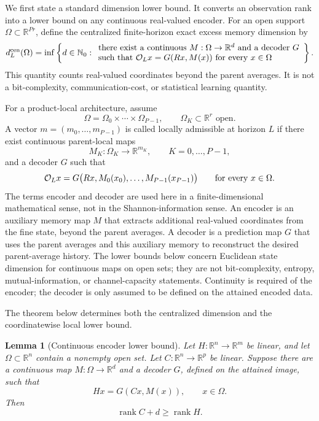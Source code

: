 \documentclass[preprint,12pt]{elsarticle}
\theoremstyle{plain}
\newtheorem{lemma}{Lemma}
\theoremstyle{remark}
\theoremstyle{definition}
\DeclareMathOperator{\rank}{rank}
\begin{document}
We first state a standard dimension lower bound.  It converts an observation
rank into a lower bound on any continuous real-valued encoder. For an open support \(\Omega\subset\mathbb R^{Pr}\), define the centralized
finite-horizon exact excess memory dimension by
\[
  d^{\rm cen}_L(\Omega)
  =
  \inf
  \left\{
   d\in\mathbb N_0:
  \begin{array}{l}
  \text{there exist a continuous }M:\Omega\to\mathbb R^d
  \text{ and a decoder }G\\
  \text{such that }
  {\cal O}_Lx=G(Rx,M(x))\text{ for every }x\in\Omega
  \end{array}
  \right\}.
\]
This quantity counts real-valued coordinates beyond the parent averages.  It
is not a bit-complexity, communication-cost, or statistical learning
quantity.

For a product-local architecture, assume
\[
  \Omega=\Omega_0\times\cdots\times\Omega_{P-1},
  \qquad
  \Omega_K\subset\mathbb R^r\text{ open}.
\]
A vector \(m=(m_0,\ldots,m_{P-1})\) is called locally admissible at horizon
\(L\) if there exist continuous parent-local maps
\[
  M_K:\Omega_K\to\mathbb R^{m_K},
  \qquad K=0,\ldots,P-1,
\]
and a decoder \(G\) such that
\[
  {\cal O}_Lx
  =
  G\bigl(Rx,M_0(x_0),\ldots,M_{P-1}(x_{P-1})\bigr)
  \qquad
  \text{for every }x\in\Omega.
\]
The terms encoder and decoder are used here in a finite-dimensional
mathematical sense, not in the Shannon-information sense.  An encoder is an
auxiliary memory map \(M\) that extracts additional real-valued coordinates
from the fine state, beyond the parent averages.  A decoder is a prediction
map \(G\) that uses the parent averages and this auxiliary memory to
reconstruct the desired parent-average history.  The lower bounds below
concern Euclidean state dimension for continuous maps on open sets; they are
not bit-complexity, entropy, mutual-information, or channel-capacity
statements.  Continuity is required of the encoder; the decoder is only
assumed to be defined on the attained encoded data.

The theorem below determines both the centralized dimension and the
coordinatewise local lower bound.

\begin{lemma}[Continuous encoder lower bound]
\label{lem:encoder}
Let \(H:\mathbb R^n\to\mathbb R^m\) be linear, and let
\(\Omega\subset\mathbb R^n\) contain a nonempty open set.  Let
\(C:\mathbb R^n\to\mathbb R^p\) be linear.  Suppose there are a continuous
map \(M:\Omega\to\mathbb R^d\) and a decoder \(G\), defined on the attained
image, such that
\[
  Hx=G(Cx,M(x)),
  \qquad x\in\Omega.
\]
Then
\[
  \rank C+d\ge \rank H.
\]
\end{lemma}
\end{document}
